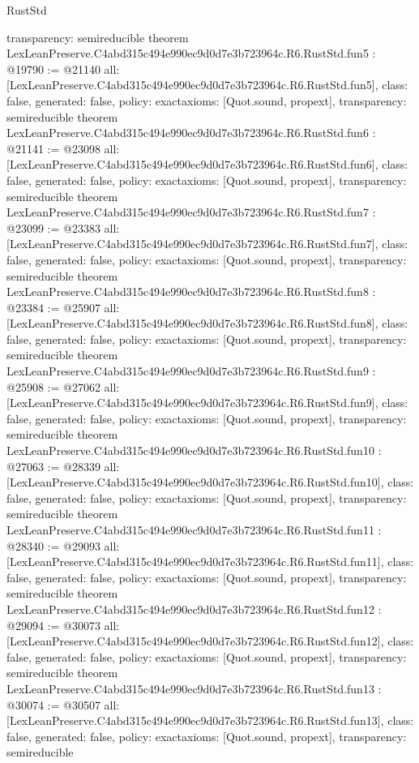 \begin{lexlean}{RustStd}
\begin{coremodule}
{  transparency: semireducible
}
theorem LexLeanPreserve.C4abd315c494e990ec9d0d7e3b723964c.R6.RustStd.fun5 : @19790 := @21140 {
  all: [LexLeanPreserve.C4abd315c494e990ec9d0d7e3b723964c.R6.RustStd.fun5],
  class: false,
  generated: false,
  policy: exact{axioms: [Quot.sound, propext]},
  transparency: semireducible
}
theorem LexLeanPreserve.C4abd315c494e990ec9d0d7e3b723964c.R6.RustStd.fun6 : @21141 := @23098 {
  all: [LexLeanPreserve.C4abd315c494e990ec9d0d7e3b723964c.R6.RustStd.fun6],
  class: false,
  generated: false,
  policy: exact{axioms: [Quot.sound, propext]},
  transparency: semireducible
}
theorem LexLeanPreserve.C4abd315c494e990ec9d0d7e3b723964c.R6.RustStd.fun7 : @23099 := @23383 {
  all: [LexLeanPreserve.C4abd315c494e990ec9d0d7e3b723964c.R6.RustStd.fun7],
  class: false,
  generated: false,
  policy: exact{axioms: [Quot.sound, propext]},
  transparency: semireducible
}
theorem LexLeanPreserve.C4abd315c494e990ec9d0d7e3b723964c.R6.RustStd.fun8 : @23384 := @25907 {
  all: [LexLeanPreserve.C4abd315c494e990ec9d0d7e3b723964c.R6.RustStd.fun8],
  class: false,
  generated: false,
  policy: exact{axioms: [Quot.sound, propext]},
  transparency: semireducible
}
theorem LexLeanPreserve.C4abd315c494e990ec9d0d7e3b723964c.R6.RustStd.fun9 : @25908 := @27062 {
  all: [LexLeanPreserve.C4abd315c494e990ec9d0d7e3b723964c.R6.RustStd.fun9],
  class: false,
  generated: false,
  policy: exact{axioms: [Quot.sound, propext]},
  transparency: semireducible
}
theorem LexLeanPreserve.C4abd315c494e990ec9d0d7e3b723964c.R6.RustStd.fun10 : @27063 := @28339 {
  all: [LexLeanPreserve.C4abd315c494e990ec9d0d7e3b723964c.R6.RustStd.fun10],
  class: false,
  generated: false,
  policy: exact{axioms: [Quot.sound, propext]},
  transparency: semireducible
}
theorem LexLeanPreserve.C4abd315c494e990ec9d0d7e3b723964c.R6.RustStd.fun11 : @28340 := @29093 {
  all: [LexLeanPreserve.C4abd315c494e990ec9d0d7e3b723964c.R6.RustStd.fun11],
  class: false,
  generated: false,
  policy: exact{axioms: [Quot.sound, propext]},
  transparency: semireducible
}
theorem LexLeanPreserve.C4abd315c494e990ec9d0d7e3b723964c.R6.RustStd.fun12 : @29094 := @30073 {
  all: [LexLeanPreserve.C4abd315c494e990ec9d0d7e3b723964c.R6.RustStd.fun12],
  class: false,
  generated: false,
  policy: exact{axioms: [Quot.sound, propext]},
  transparency: semireducible
}
theorem LexLeanPreserve.C4abd315c494e990ec9d0d7e3b723964c.R6.RustStd.fun13 : @30074 := @30507 {
  all: [LexLeanPreserve.C4abd315c494e990ec9d0d7e3b723964c.R6.RustStd.fun13],
  class: false,
  generated: false,
  policy: exact{axioms: [Quot.sound, propext]},
  transparency: semireducible
}
\end{coremodule}
\end{lexlean}
